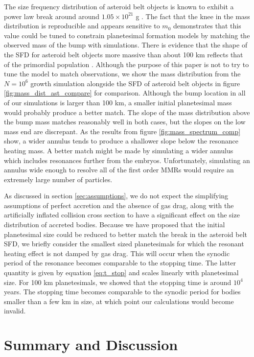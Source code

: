 The size frequency distribution of asteroid belt objects is known to exhibit a power law break around around 
$1.05 \times 10^{21}$ g \cite{jedicke02}. The fact that the knee in the mass distribution is reproducible and appears sensitive to 
$m_{0}$ demonstrates that this value could be tuned to constrain planetesimal formation models by matching the observed 
mass of the bump with simulations. There is evidence that the shape of the SFD for asteroid belt objects more massive than 
about 100 km reflects that of the primordial population \cite{morbidelli09}. Although the purpose of this paper is not to try to tune 
the model to match observations, we show the mass distribution from the $N=10^6$ growth simulation alongside the SFD of 
asteroid belt objects \cite{bottke05} in figure \ref{fig:mass_dist_ast_compare} for comparison. Although the bump location in all 
of our simulations is larger than 100 km, a smaller initial planetesimal mass would probably produce a better match. The slope of 
the mass distribution above the bump mass matches reasonably well in both cases, but the slopes on the low mass end are 
discrepant. As the results from figure \ref{fig:mass_spectrum_comp} show, a wider annulus tends to produce a shallower slope 
below the resonance heating mass. A better match might be made by simulating a wider annulus which includes resonances 
further from the embryos. Unfortunately, simulating an annulus wide enough to resolve all of the first order MMRs would require 
an extremely large number of particles.

As discussed in section \ref{sec:assumptions}, we do not expect the simplifying assumptions of perfect accretion and the 
absence of gas drag, along with the artificially inflated collision cross section to have a significant effect on the size distribution of 
accreted bodies. Because we have proposed that the initial planetesimal size could be reduced to better match the break in the 
asteroid belt SFD, we briefly consider the smallest sized planetesimals for which the resonant heating effect is not damped by 
gas drag. This will occur when the synodic period of the resonance becomes comparable to the stopping time. The latter quantity 
is given by equation \ref{eq:t_stop} and scales linearly with planetesimal size. For 100 km planetesimals, we showed that the 
stopping time is around $10^4$ years. The stopping time becomes comparable to the synodic period for bodies smaller than a 
few km in size, at which point our calculations would become invalid.

\section{Summary and Discussion} \label{sec:discussion}

